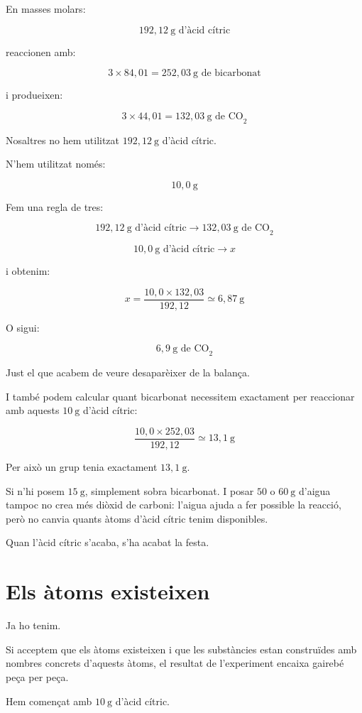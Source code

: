 En masses molars:

\[
192,12\ \text{g d'àcid cítric}
\]

reaccionen amb:

\[
3\times84,01=252,03\ \text{g de bicarbonat}
\]

i produeixen:

\[
3\times44,01=132,03\ \text{g de CO}_{2}
\]

Nosaltres no hem utilitzat \(192,12\ \text{g}\) d'àcid cítric.

N'hem utilitzat només:

\[
10,0\ \text{g}
\]

Fem una regla de tres:

\[
192,12\ \text{g d'àcid cítric}
\longrightarrow
132,03\ \text{g de CO}_{2}
\]

\[
10,0\ \text{g d'àcid cítric}
\longrightarrow
x
\]

i obtenim:

\[
x=
\frac{10,0\times132,03}{192,12}
\simeq 6,87\ \text{g}
\]

O sigui:

\[
\boxed{6,9\ \text{g de CO}_{2}}
\]

Just el que acabem de veure desaparèixer de la balança.

I també podem calcular quant bicarbonat necessitem exactament per reaccionar amb aquests \(10\ \text{g}\) d'àcid cítric:

\[
\frac{10,0\times252,03}{192,12}
\simeq 13,1\ \text{g}
\]

Per això un grup tenia exactament \(13,1\ \text{g}\).

Si n'hi posem \(15\ \text{g}\), simplement sobra bicarbonat. I posar \(50\) o \(60\ \text{g}\) d'aigua tampoc no crea més diòxid de carboni: l'aigua ajuda a fer possible la reacció, però no canvia quants àtoms d'àcid cítric tenim disponibles.

Quan l'àcid cítric s'acaba, s'ha acabat la festa.

\section{Els àtoms existeixen}

Ja ho tenim.

Si acceptem que els àtoms existeixen i que les substàncies estan construïdes amb nombres concrets d'aquests àtoms, el resultat de l'experiment encaixa gairebé peça per peça.

Hem començat amb \(10\ \text{g}\) d'àcid cítric.

